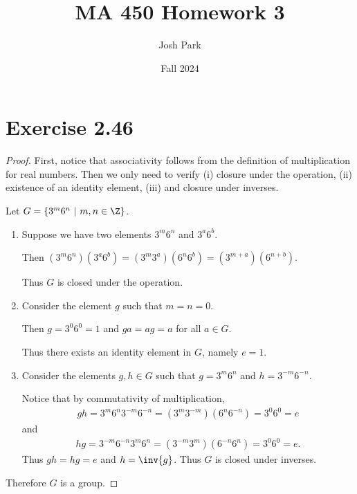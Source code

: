 \documentclass{article}
\author{Josh Park}
\date{\vspace*{-1em}Fall 2024}
\title{\vspace*{-2em}MA 450 Homework 3\vspace*{-1em}}
\begin{document}
\maketitle
\section*{Exercise 2.46}
\begin{proof} First, notice that associativity follows from the definition of multiplication for real numbers. Then we only need to verify (i) closure under the operation, (ii) existence of an identity element, (iii) and closure under inverses.

Let \(G=\{3^m 6^n \ \vert\ m,n\in\Z\}\).
\begin{enumerate}[label=(\roman*)]
    \item Suppose we have two elements \(3^m 6^n\) and \(3^a6^b\).

    Then \((3^m 6^n)(3^a6^b)=(3^m 3^a)(6^n6^b) = (3^{m+a})(6^{n+b})\).

    Thus \(G\) is closed under the operation.

    \item Consider the element \(g\) such that \(m = n = 0\).

    Then \(g=3^0 6^0 = 1\) and \(ga=ag=a\) for all \(a\in G\).

    Thus there exists an identity element in \(G\), namely \(e=1\).

    \item Consider the elements \(g, h \in G\) such that \(g = 3^m 6^n\) and \(h = 3^{-m} 6^{-n}\).

    Notice that by commutativity of multiplication,
    \begin{align}
        gh = 3^m 6^n 3^{-m} 6^{-n} = (3^m 3^{-m}) (6^n 6^{-n}) = 3^0 6^0 = e
    \end{align}
    and
    \begin{align}
        hg = 3^{-m} 6^{-n} 3^m 6^n = (3^{-m} 3^m) (6^{-n} 6^n) = 3^0 6^0 = e.
    \end{align}
    Thus \(gh=hg=e\) and \(h=\inv{g}\). Thus \(G\) is closed under inverses.
\end{enumerate}
Therefore \(G\) is a group.
\end{proof}
\end{document}
